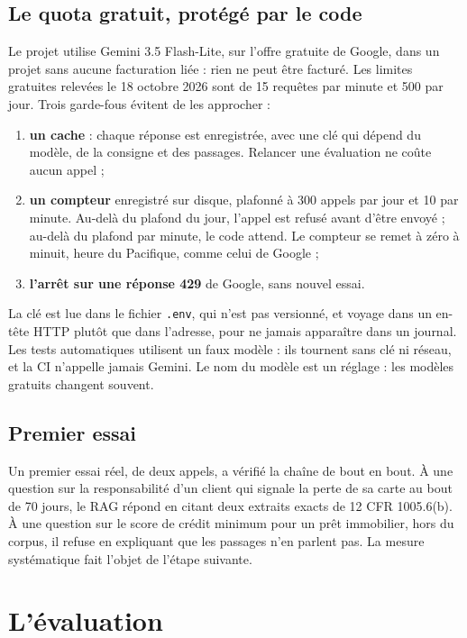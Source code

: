 \documentclass[11pt,a4paper]{article}
\begin{document}
\subsection{Le quota gratuit, protégé par le code}

Le projet utilise Gemini 3.5 Flash-Lite, sur l'offre gratuite de Google, dans un projet sans aucune facturation liée : rien ne peut être facturé. Les limites gratuites relevées le 18 octobre 2026 sont de 15 requêtes par minute et 500 par jour. Trois garde-fous évitent de les approcher :
\begin{enumerate}
  \item \textbf{un cache} : chaque réponse est enregistrée, avec une clé qui dépend du modèle, de la consigne et des passages. Relancer une évaluation ne coûte aucun appel ;
  \item \textbf{un compteur} enregistré sur disque, plafonné à 300 appels par jour et 10 par minute. Au-delà du plafond du jour, l'appel est refusé avant d'être envoyé ; au-delà du plafond par minute, le code attend. Le compteur se remet à zéro à minuit, heure du Pacifique, comme celui de Google ;
  \item \textbf{l'arrêt sur une réponse 429} de Google, sans nouvel essai.
\end{enumerate}

La clé est lue dans le fichier \texttt{.env}, qui n'est pas versionné, et voyage dans un en-tête HTTP plutôt que dans l'adresse, pour ne jamais apparaître dans un journal. Les tests automatiques utilisent un faux modèle : ils tournent sans clé ni réseau, et la CI n'appelle jamais Gemini. Le nom du modèle est un réglage : les modèles gratuits changent souvent.

\subsection{Premier essai}

Un premier essai réel, de deux appels, a vérifié la chaîne de bout en bout. À une question sur la responsabilité d'un client qui signale la perte de sa carte au bout de 70 jours, le RAG répond en citant deux extraits exacts de 12 CFR 1005.6(b). À une question sur le score de crédit minimum pour un prêt immobilier, hors du corpus, il refuse en expliquant que les passages n'en parlent pas. La mesure systématique fait l'objet de l'étape suivante.

\section{L'évaluation}
\end{document}
